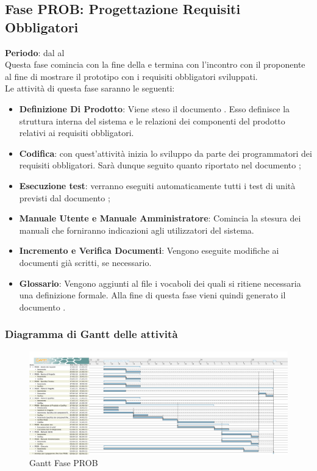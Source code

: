 \subsection{Fase PROB: Progettazione Requisiti Obbligatori}
	\textbf{Periodo}: dal  al  \\Questa fase comincia con la fine della  e termina con l'incontro con il proponente al fine di mostrare il prototipo con i requisiti obbligatori sviluppati.\\Le attività di questa fase saranno le seguenti:
	\begin{itemize}
		\item\textbf{Definizione Di Prodotto}: Viene steso il documento . Esso definisce la struttura interna del sistema e le relazioni dei componenti del prodotto relativi ai requisiti obbligatori.
		\item \textbf{Codifica}: con quest'attività inizia lo sviluppo da parte dei programmatori dei requisiti obbligatori. Sarà dunque seguito quanto riportato nel documento ;
		\item \textbf{Esecuzione test}: verranno eseguiti automaticamente tutti i test di unità previsti dal documento ;
		\item\textbf{Manuale Utente e Manuale Amministratore}: Comincia la stesura dei manuali che forniranno indicazioni agli utilizzatori del sistema.
		\item\textbf{Incremento e Verifica Documenti}: Vengono eseguite modifiche ai documenti già scritti, se necessario.
		\item\textbf{Glossario}: Vengono aggiunti al file  i vocaboli dei quali si ritiene necessaria una definizione formale. Alla fine di questa fase vieni quindi generato il documento .
	\end{itemize}
	\subsubsection{Diagramma di Gantt delle attività}
	\begin{figure}[H]\centering
		\includegraphics[width=\textwidth]{PianoDiProgetto/Pics/FasePROB.png}
	\caption{Gantt Fase PROB}
\end{figure}
